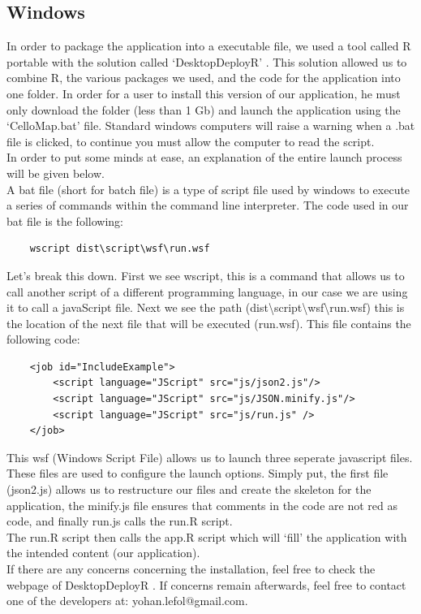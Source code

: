 \documentclass[11pt]{article}
\begin{document}
\subsection{Windows}
In order to package the application into a executable file, we used a tool called R portable \cite{R_portable} with the solution called `DesktopDeployR' \cite{Deploy_R_Shiny}. This solution allowed us to combine R, the various packages we used, and the code for the application into one folder. In order for a user to install this version of our application, he must only download the folder (less than 1 Gb) and launch the application using the `CelloMap.bat' file. Standard windows computers will raise a warning when a .bat file is clicked, to continue you must allow the computer to read the script.\\
In order to put some minds at ease, an explanation of the entire launch process will be given below.\\
A bat file (short for batch file) is a type of script file used by windows to execute a series of commands within the command line interpreter. The code used in our bat file is the following:
\lstset{language=C++}
\begin{lstlisting}
	wscript dist\script\wsf\run.wsf
\end{lstlisting}
Let's break this down. First we see wscript, this is a command that allows us to call another script of a different programming language, in our case we are using it to call a javaScript file. Next we see the path (dist\textbackslash script\textbackslash wsf\textbackslash run.wsf) this is the location of the next file that will be executed (run.wsf). This file contains the following code:
\lstset{language=Java}
\begin{lstlisting}
	<job id="IncludeExample">
   		<script language="JScript" src="js/json2.js"/>
   		<script language="JScript" src="js/JSON.minify.js"/>
   		<script language="JScript" src="js/run.js" />
	</job>
\end{lstlisting}
This \acrshort{wsf} (Windows Script File) allows us to launch three seperate javascript files. These files are used to configure the launch options. Simply put, the first file (json2.js) allows us to restructure our files and create the skeleton for the application, the minify.js file ensures that comments in the code are not red as code, and finally run.js calls the run.R script.\\
The run.R script then calls the app.R script which will `fill' the application with the intended content (our application).\\
If there are any concerns concerning the installation, feel free to check the webpage of DesktopDeployR \cite{Deploy_R_Shiny}. If concerns remain afterwards, feel free to contact one of the developers at: yohan.lefol@gmail.com.
\end{document}
